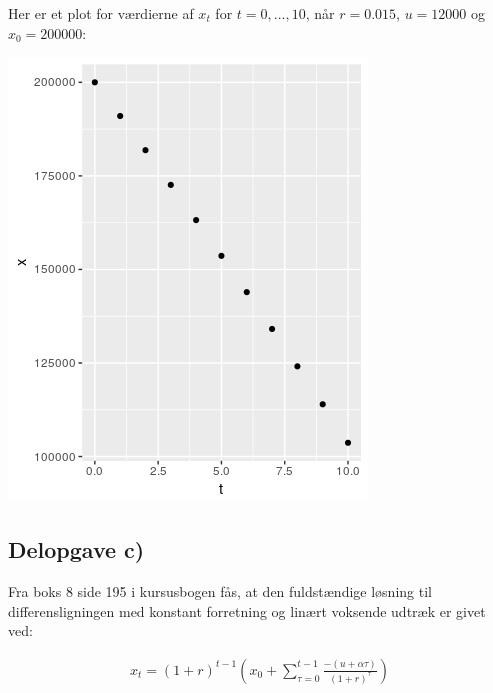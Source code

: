 \documentclass[12pt]{article}
\begin{document}
Her er et plot for værdierne af $x_t$ for $t=0,...,10$, når $r=0.015$, $u=12000$ og $x_0=200000$:
\begin{center}
\includegraphics[scale=0.5]{q1p1.png}
\end{center}

\subsection{Delopgave c)}

Fra boks 8 side 195 i kursusbogen fås, at den fuldstændige løsning til differensligningen med konstant forretning og linært voksende udtræk er givet ved:

\begin{align}
x_t = (1+r)^{t-1}\left(x_0 + \sum_{\tau=0}^{t-1}\frac{-(u + \alpha\tau)}{(1+r)^\tau} \right)
\end{align}
\end{document}
